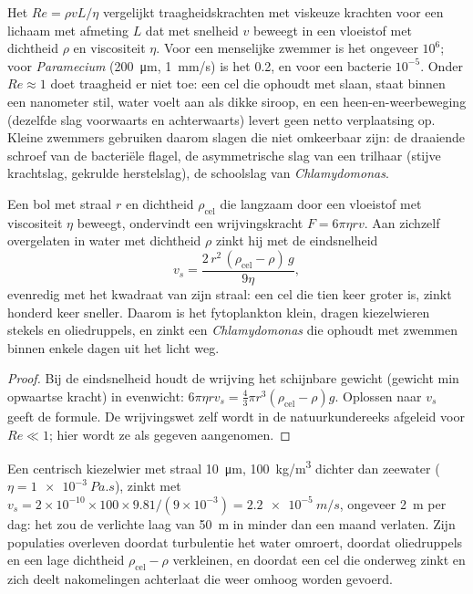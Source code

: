 \begin{proposition}\label{prop:b2:unicellular-diversity:reynolds}
Het \emph{} $Re = \rho v L/\eta$ vergelijkt
traagheidskrachten met viskeuze krachten voor een lichaam met afmeting
$L$ dat met snelheid $v$ beweegt in een vloeistof met dichtheid $\rho$
en viscositeit $\eta$. Voor een menselijke zwemmer is het ongeveer
$10^6$; voor \emph{Paramecium} (\qty{200}{\micro m}, \qty{1}{mm/s})
is het 0.2, en voor een bacterie $10^{-5}$. Onder
$Re \approx 1$ doet traagheid er niet toe: een cel die ophoudt met
slaan, staat binnen een nanometer stil, water voelt aan als dikke
siroop, en een heen-en-weerbeweging (dezelfde slag voorwaarts en
achterwaarts) levert geen netto verplaatsing op. Kleine zwemmers
gebruiken daarom slagen die niet omkeerbaar zijn: de draaiende schroef
van de bacteriële flagel, de asymmetrische slag van een trilhaar
(stijve krachtslag, gekrulde herstelslag), de schoolslag van
\emph{Chlamydomonas}.
\end{proposition}

\begin{theorem}\label{thm:b2:unicellular-diversity:stokes}
Een bol met straal $r$ en dichtheid $\rho_{\text{cel}}$ die langzaam
door een vloeistof met viscositeit $\eta$ beweegt, ondervindt een
wrijvingskracht $F = 6\pi\eta r v$. Aan zichzelf overgelaten in water met
dichtheid $\rho$ zinkt hij met de eindsnelheid
\[
v_s = \frac{2\,r^2\,(\rho_{\text{cel}} - \rho)\,g}{9\eta},
\]
evenredig met het kwadraat van zijn straal: een cel die tien keer
groter is, zinkt honderd keer sneller. Daarom is het fytoplankton
klein, dragen kiezelwieren stekels en oliedruppels, en zinkt een
\emph{Chlamydomonas} die ophoudt met zwemmen binnen enkele dagen uit
het licht weg.
\end{theorem}
\begin{proof}
Bij de eindsnelheid houdt de wrijving het schijnbare gewicht (gewicht
min opwaartse kracht) in evenwicht: $6\pi\eta r v_s = \tfrac{4}{3}\pi r^3
(\rho_{\text{cel}} - \rho) g$. Oplossen naar $v_s$ geeft de formule.
De wrijvingswet zelf wordt in de natuurkundereeks afgeleid voor
$Re \ll 1$; hier wordt ze als gegeven aangenomen.
\end{proof}

\begin{example}\label{ex:b2:unicellular-diversity:fall}
Een centrisch kiezelwier met straal \qty{10}{\micro m}, \qty{100}{kg/m^3}
dichter dan zeewater ($\eta = \qty{1e-3}{Pa.s}$), zinkt met
$v_s = 2\times 10^{-10}\times 100\times 9.81/(9\times 10^{-3}) =
\qty{2.2e-5}{m/s}$, ongeveer \qty{2}{m} per dag: het zou de verlichte
laag van \qty{50}{m} in minder dan een maand verlaten. Zijn populaties
overleven doordat turbulentie het water omroert, doordat oliedruppels en
een lage dichtheid $\rho_{\text{cel}} - \rho$ verkleinen, en doordat een
cel die onderweg zinkt en zich deelt nakomelingen achterlaat die weer
omhoog worden gevoerd.
\end{example}

